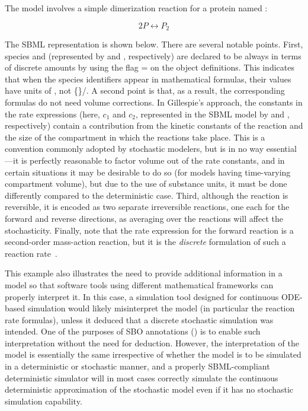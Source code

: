 The model involves a simple dimerization reaction for a protein
named :
\begin{linenomath}
\begin{equation*}
    2 P  \leftrightarrow  P_2
\end{equation*}
\end{linenomath}
The SBML representation is shown below.  There are several notable
points.  First, species  and  (represented
by  and , respectively) are declared to be always
in terms of discrete amounts by using the flag
= on the \Species object
definitions.  This indicates that when the species identifiers
appear in mathematical formulas, their values have units of
, not \{\}/.  A second point is that, as a result,
the corresponding \KineticLaw formulas do not need volume
corrections.  In Gillespie's approach, the constants in the rate
expressions (here, $c_1$ and $c_2$, represented in the SBML model
by  and , respectively) contain a contribution
from the kinetic constants of the reaction and the size of the
compartment in which the reactions take place.  This is a
convention commonly adopted by stochastic modelers, but is in no
way essential---it is perfectly reasonable to factor volume out of
the rate constants, and in certain situations it may be desirable
to do so (\eg for models having time-varying compartment volume),
but due to the use of substance units, it must be done differently
compared to the deterministic case.  Third, although the reaction
is reversible, it is encoded as two separate irreversible
reactions, one each for the forward and reverse directions, as
averaging over the reactions will affect the stochasticity.
Finally, note that the rate expression for the forward reaction is
a second-order mass-action reaction, but it is the \emph{discrete}
formulation of such a reaction rate~\citep{gillespie:1977}.


This example also illustrates the need to provide additional
information in a model so that software tools using different
mathematical frameworks can properly interpret it.  In this case,
a simulation tool designed for continuous ODE-based simulation
would likely misinterpret the model (in particular the reaction
rate formulas), unless it deduced that a discrete stochastic
simulation was intended.  One of the purposes of SBO annotations
() is to enable such interpretation
without the need for deduction. However, the interpretation of the
model is essentially the same irrespective of whether the model is
to be simulated in a deterministic or stochastic manner, and a
properly SBML-compliant deterministic simulator will in most cases
correctly simulate the continuous deterministic approximation
of the stochastic model even if it has no stochastic simulation
capability.

